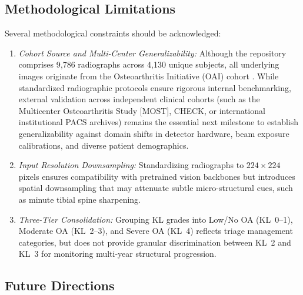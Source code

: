 \documentclass[10pt,journal]{IEEEtran}
\begin{document}
\subsection{Methodological Limitations}
\label{subsec:critical_limitations}

Several methodological constraints should be acknowledged:
\begin{enumerate}[leftmargin=*]
\item \textit{Cohort Source and Multi-Center Generalizability:} Although the repository comprises 9,786 radiographs across 4,130 unique subjects, all underlying images originate from the Osteoarthritis Initiative (OAI) cohort \cite{nevitt2006oai}. While standardized radiographic protocols ensure rigorous internal benchmarking, external validation across independent clinical cohorts (such as the Multicenter Osteoarthritis Study [MOST], CHECK, or international institutional PACS archives) remains the essential next milestone to establish generalizability against domain shifts in detector hardware, beam exposure calibrations, and diverse patient demographics.
\item \textit{Input Resolution Downsampling:} Standardizing radiographs to $224 \times 224$ pixels ensures compatibility with pretrained vision backbones but introduces spatial downsampling that may attenuate subtle micro-structural cues, such as minute tibial spine sharpening.
\item \textit{Three-Tier Consolidation:} Grouping KL grades into Low/No OA (KL~0--1), Moderate OA (KL~2--3), and Severe OA (KL~4) reflects triage management categories, but does not provide granular discrimination between KL~2 and KL~3 for monitoring multi-year structural progression.
\end{enumerate}

\subsection{Future Directions}
\label{subsec:future_scope}
\end{document}

